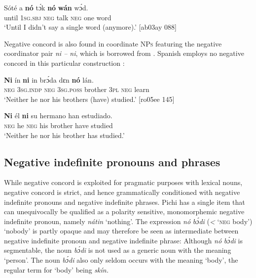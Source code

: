 \ea%
    \label{ex:key:554}
    \gll Sóté    a    \textbf{nó}  tɔ́k  \textbf{nó}  \textbf{wán}    wɔ́d.\\
until  \textsc{1sg.sbj}  \textsc{neg}  talk  \textsc{neg}  one    word\\

\glt ‘Until I didn’t say a single word (anymore).’ [ab03ay 088]
\z

Negative concord is also found in coordinate \textsc{NPs} featuring the negative coordinator pair \textit{ni -- ni}, which is borrowed from  . Spanish employs no negative concord in this particular construction : 


\ea%
    \label{ex:key:555}
    \gll \textbf{Ni}  ín    \textbf{ni}  in    brɔ́da  dɛn  \textbf{nó}  lán.\\
\textsc{neg}  \textsc{3sg.indp}  \textsc{neg}  \textsc{3sg.poss}  brother  \textsc{3pl}  \textsc{neg}  learn\\

\glt ‘Neither he nor his brothers (have) studied.’ [ro05ee 145]
\z


\ea%
    \label{ex:key:556}
    \gll \textbf{Ni}  él  \textbf{ni}  su  hermano    han    estudiado.\\
\textsc{neg}  he  \textsc{neg}  his  brother    have  studied\\

\glt ‘Neither he nor his brother has studied.’
\z

\subsection{Negative indefinite pronouns and phrases}\label{sec:7.2.3}

While negative concord is exploited for pragmatic purposes with lexical nouns, negative concord is strict, and hence grammatically conditioned with negative indefinite pronouns and negative indefinite phrases. Pichi has a single item that can unequivocally be qualified as a polarity sensitive, monomorphemic negative indefinite pronoun, namely \textit{nátin} ‘nothing’. The expression \textit{nó} \textit{bɔ́di} (\textit{<} ‘\textsc{neg} body’) ‘nobody’ is partly opaque and may therefore be seen as intermediate between negative indefinite pronoun and negative indefinite phrase: Although \textit{nó} \textit{bɔ́di} is segmentable, the noun \textit{bɔ́di} is not used as a generic noun with the meaning ‘person’. The noun \textit{bɔ́di} also only seldom occurs with the meaning ‘body’, the regular term for ‘body’ being \textit{skín.} 



